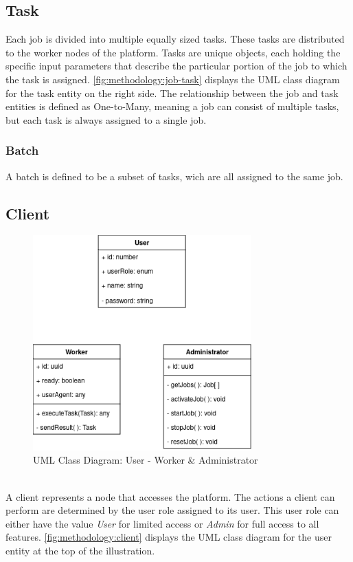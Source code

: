 \subsection{Task}
\label{subsec:methodology:entities:task}
Each job is divided into multiple equally sized tasks. These tasks are distributed to the worker nodes of the platform. Tasks are unique objects, each holding the specific input parameters that describe the particular portion of the job to which the task is assigned. \autoref{fig:methodology:job-task} displays the \ac{UML} class diagram for the task entity on the right side. The relationship between the job and task entities is defined as One-to-Many, meaning a job can consist of multiple tasks, but each task is always assigned to a single job.

\subsubsection{Batch}
\label{ssubsec:methodology:entities:task:batch}
A batch is defined to be a subset of tasks, wich are all assigned to the same job.

\subsection{Client}
\label{subsec:methodology:entities:client}
\begin{figure}[htbp]
  \centering
  \includegraphics[width=0.75\textwidth]{gfx/figures/Client.png}
  \caption{\acs{UML} Class Diagram: User - Worker \& Administrator}
  \label{fig:methodology:client}
\end{figure}
~\\
A client represents a node that accesses the platform. The actions a client can perform are determined by the user role assigned to its user. This user role can either have the value \emph{User} for limited access or \emph{Admin} for full access to all features. \autoref{fig:methodology:client} displays the \ac{UML} class diagram for the user entity at the top of the illustration.

